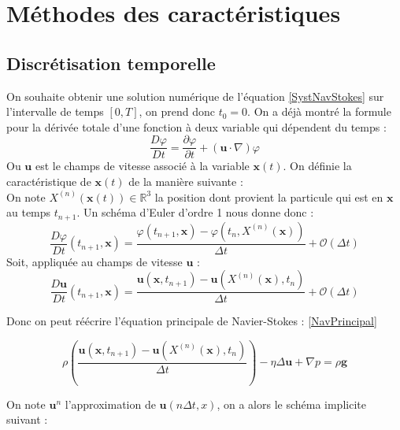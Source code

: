 \section{Méthodes des caractéristiques}
\subsection{Discrétisation temporelle}

On souhaite obtenir une solution numérique de l'équation \ref{SystNavStokes} sur l'intervalle de temps $[0, T]$, on prend donc $t_0 = 0$.
On a déjà montré la formule pour la dérivée totale d'une fonction à deux variable qui dépendent du temps : 
\begin{equation}
\frac{D \varphi}{D t}=\frac{\partial \varphi}{\partial t}+(\mathbf{u} \cdot \nabla) \varphi
\end{equation}
Ou $\mathbf{u}$ est le champs de vitesse associé à la variable $\mathbf{x}(t)$.
On définie la caractéristique de $\mathbf{x}(t)$ de la manière suivante : \\
On note $X^{(n)}(\mathbf{x}(t)) \in \mathbb{R}^{3}$  la position dont provient la particule qui est en 
$\mathbf{x}$ au temps $t_{n+1}$.
Un schéma d'Euler d'ordre 1 nous donne donc : 
\begin{equation}
\frac{D \varphi}{D t}\left(t_{n+1}, \mathbf{x}\right)=\frac{\varphi\left(t_{n+1}, \mathbf{x}\right)-\varphi\left(t_{n}, X^{(n)}(\mathbf{x})\right)}{\Delta t}+\mathcal{O}(\Delta t)
\end{equation}
Soit, appliquée au champs de vitesse $\mathbf{u}$ : 
\begin{equation}
\frac{D \mathbf{u}}{D t}\left(t_{n+1}, \mathbf{x}\right)=\frac{\mathbf{u}\left(\mathbf{x}, t_{n+1}\right)-\mathbf{u}\left(X^{(n)}(\mathbf{x}), t_{n}\right)}{\Delta t}+\mathcal{O}(\Delta t)
\end{equation}

Donc on peut réécrire l'équation principale de Navier-Stokes : \ref{NavPrincipal} 

\begin{equation}
\rho\left(\frac{\mathbf{u}\left(\mathbf{x}, t_{n+1}\right)-\mathbf{u}\left(X^{(n)}(\mathbf{x}), t_{n}\right)}{\Delta t}\right)-\eta \Delta \mathbf{u} +\nabla p=\rho \mathbf{g}
\end{equation}

On note $\mathbf{u}^{n}$ l'approximation de $\mathbf{u}(n\Delta t, x) $, on a alors le schéma implicite suivant : \\


